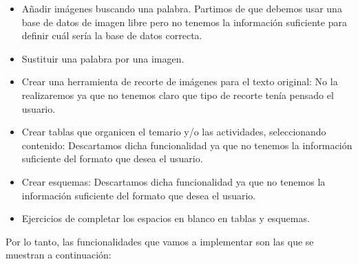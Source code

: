 \begin{itemize}
  \item Añadir imágenes buscando una palabra. Partimos de que debemos usar una base de datos de imagen libre pero no tenemos la información suficiente para definir cuál sería la base de datos correcta.
  \item Sustituir una palabra por una imagen.
  \item Crear una herramienta de recorte de imágenes para el texto original: No la realizaremos ya que no tenemos claro que tipo de recorte tenía pensado el usuario.
  \item Crear tablas que organicen el temario y/o las actividades, seleccionando contenido: Descartamos dicha funcionalidad ya que no tenemos la información suficiente del formato que desea el usuario.
  \item Crear esquemas: Descartamos dicha funcionalidad ya que no tenemos la información suficiente del formato que desea el usuario.
  \item Ejercicios de completar los espacios en blanco en tablas y esquemas.
\end{itemize}

Por lo tanto, las funcionalidades que vamos a implementar son las que se muestran a continuación:


